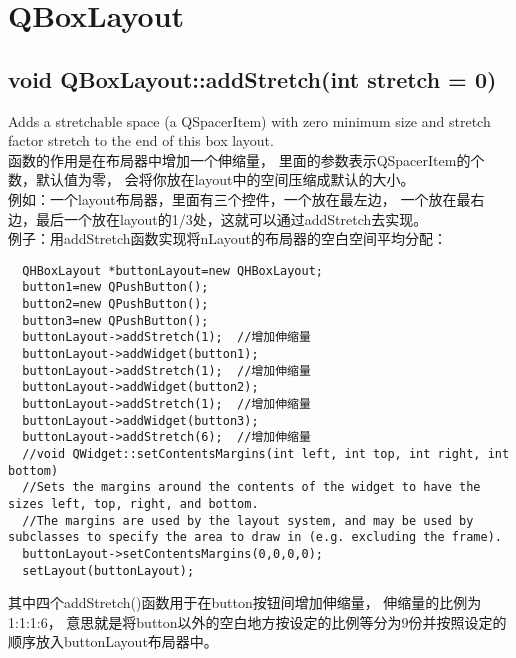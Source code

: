 \chapter{QBoxLayout}
\section{void QBoxLayout::addStretch(int stretch = 0)}
Adds a stretchable space (a QSpacerItem) with zero minimum size and stretch factor stretch to the end of this box layout.\\
函数的作用是在布局器中增加一个伸缩量，%
里面的参数表示QSpacerItem的个数，默认值为零，%
会将你放在layout中的空间压缩成默认的大小。\\
例如：一个layout布局器，里面有三个控件，一个放在最左边，%
一个放在最右边，最后一个放在layout的1/3处，这就可以通过addStretch去实现。\\
例子：用addStretch函数实现将nLayout的布局器的空白空间平均分配：
\begin{lstlisting}
  QHBoxLayout *buttonLayout=new QHBoxLayout;
  button1=new QPushButton();
  button2=new QPushButton();
  button3=new QPushButton();
  buttonLayout->addStretch(1);  //增加伸缩量
  buttonLayout->addWidget(button1);
  buttonLayout->addStretch(1);  //增加伸缩量
  buttonLayout->addWidget(button2);
  buttonLayout->addStretch(1);  //增加伸缩量
  buttonLayout->addWidget(button3);
  buttonLayout->addStretch(6);  //增加伸缩量
  //void QWidget::setContentsMargins(int left, int top, int right, int bottom)
  //Sets the margins around the contents of the widget to have the sizes left, top, right, and bottom.
  //The margins are used by the layout system, and may be used by subclasses to specify the area to draw in (e.g. excluding the frame).
  buttonLayout->setContentsMargins(0,0,0,0);
  setLayout(buttonLayout);
\end{lstlisting}
其中四个addStretch()函数用于在button按钮间增加伸缩量，%
伸缩量的比例为1:1:1:6，%
意思就是将button以外的空白地方按设定的比例等分为9份并按照设定的顺序放入buttonLayout布局器中。%
